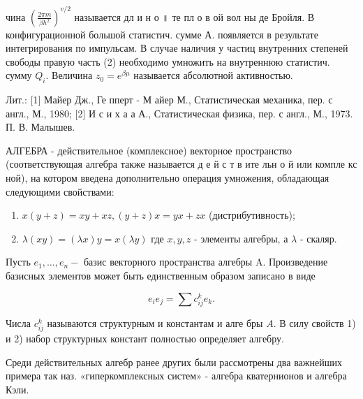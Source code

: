 \documentclass[10pt]{article}
\begin{document}
чина $\left(\frac{2 \pi m}{\beta h^{2}}\right)^{v / 2}$ называется дл и н о ॥ те пл о в ой вол ны де Бройля. В конфигурационной большой статистич. сумме А. появляется в результате интегрирования по импульсам. В случае наличия у частиц внутренних степеней свободы правую часть (2) необходимо умножить на внутреннюю статистич. сумму $Q_{i}$. Величина $z_{0}=e^{\beta \mu}$ называется абсолютной активностью.



Лит.: [1] Майер Дж., Ге пперт - М айер М., Статистическая механика, пер. с англ., М., 1980; [2] И с и х а а А., Статистическая физика, пер. с англ., М., 1973. П. В. Малышев.



АЛГЕБРА - действительное (комплексное) векторное пространство (соответствующая алгебра также называется д е й с т в ите льн о й или компле кс ной), на котором введена дополнительно операция умножения, обладающая следующими свойствами:



\begin{enumerate}

  \item $x(y+z)=x y+x z,(y+z) x=y x+z x$ (дистрибутивность);



  \item $\lambda(x y)=(\lambda x) y=x(\lambda y)$ где $x, y, z$ - элементы алгебры, а $\lambda$ - скаляр.



\end{enumerate}



Пусть $e_{1}, \ldots, e_{n}-$ базис векторного пространства алгебры A. Произведение базисных элементов может быть единственным образом записано в виде



\[

e_{i} e_{j}=\sum c_{i j}^{k} e_{k} .

\]



Числа $c_{i j}^{k}$ называются структурным и константам и алге бры $A$. В силу свойств 1) и 2) набор структурных констант полностью определяет алгебру.



Среди действительных алгебр ранее других были рассмотрены два важнейших примера так наз. «гиперкомплексных систем» - алгебра кватернионов и алгебра Кэли.
\end{document}
